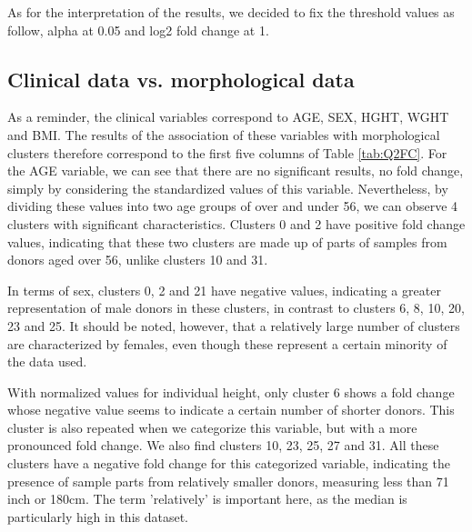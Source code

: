 \documentclass[a4paper, 11pt]{article}
\begin{document}
\begin{multicols}{2}
As for the interpretation of the results, we decided to fix the threshold values as follow, alpha at 0.05 and log2 fold change at 1.


\subsection{Clinical data vs. morphological data}

As a reminder, the clinical variables correspond to AGE, SEX, HGHT, WGHT and BMI. The results of the association of these variables with morphological clusters therefore correspond to the first five columns of Table \ref{tab:Q2FC}.
For the AGE variable, we can see that there are no significant results, no fold change, simply by considering the standardized values of this variable. Nevertheless, by dividing these values into two age groups of over and under 56, we can observe 4 clusters with significant characteristics. Clusters 0 and 2 have positive fold change values, indicating that these two clusters are made up of parts of samples from donors aged over 56, unlike clusters 10 and 31. 

In terms of sex, clusters 0, 2 and 21 have negative values, indicating a greater representation of male donors in these clusters, in contrast to clusters 6, 8, 10, 20, 23 and 25. It should be noted, however, that a relatively large number of clusters are characterized by females, even though these represent a certain minority of the data used. 

With normalized values for individual height, only cluster 6 shows a fold change whose negative value seems to indicate a certain number of shorter donors. This cluster is also repeated when we categorize this variable, but with a more pronounced fold change. We also find clusters 10, 23, 25, 27 and 31. All these clusters have a negative fold change for this categorized variable, indicating the presence of sample parts from relatively smaller donors, measuring less than 71 inch or 180cm. The term 'relatively' is important here, as the median is particularly high in this dataset.


\end{multicols}
\end{document}
